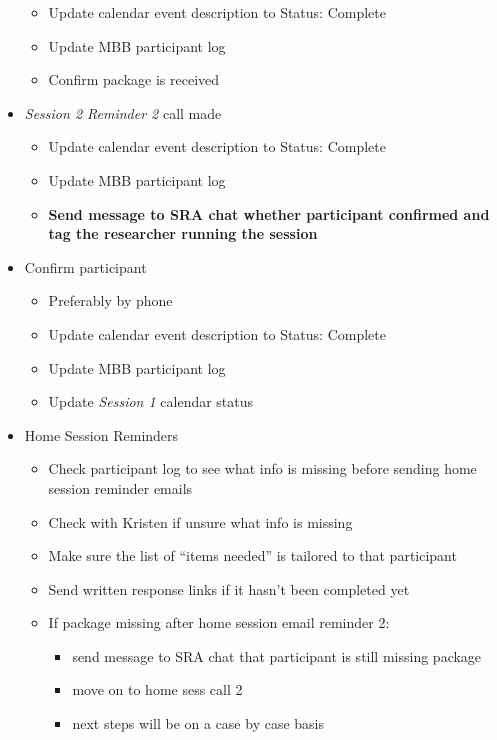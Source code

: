 \documentclass[
]{book}
\providecommand{\tightlist}{%
  \setlength{\itemsep}{0pt}\setlength{\parskip}{0pt}}
\begin{document}
\begin{itemize}
  \begin{itemize}
  \tightlist
  \item
    Update calendar event description to Status: Complete
  \item
    Update MBB participant log
  \item
    Confirm package is received
  \end{itemize}
\item
  \emph{Session 2 Reminder 2} call made

  \begin{itemize}
  \tightlist
  \item
    Update calendar event description to Status: Complete
  \item
    Update MBB participant log
  \item
    \textbf{Send message to SRA chat whether participant confirmed and tag the researcher running the session}
  \end{itemize}
\item
  Confirm participant

  \begin{itemize}
  \tightlist
  \item
    Preferably by phone
  \item
    Update calendar event description to Status: Complete
  \item
    Update MBB participant log
  \item
    Update \emph{Session 1} calendar status
  \end{itemize}
\item
  Home Session Reminders

  \begin{itemize}
  \tightlist
  \item
    Check participant log to see what info is missing before sending home session reminder emails
  \item
    Check with Kristen if unsure what info is missing
  \item
    Make sure the list of ``items needed'' is tailored to that participant
  \item
    Send written response links if it hasn't been completed yet
  \item
    If package missing after home session email reminder 2:

    \begin{itemize}
    \tightlist
    \item
      send message to SRA chat that participant is still missing package
    \item
      move on to home sess call 2
    \item
      next steps will be on a case by case basis
    \end{itemize}
  \end{itemize}
\end{itemize}
\end{document}
